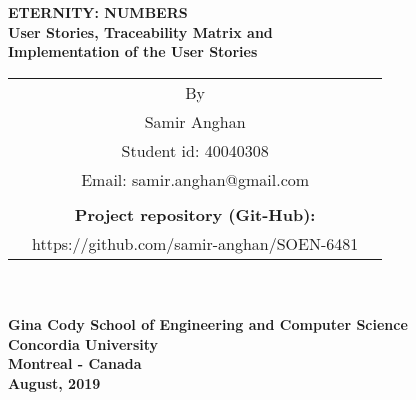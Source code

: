 \thispagestyle{empty}
\begin{center}
\Large \textbf{ ETERNITY: NUMBERS \\User Stories, Traceability Matrix and \\Implementation of the User Stories  \\}
\normalsize
\vspace{84pt}

\large
\begin{tabular}{ccc}
&By&\\
&Samir Anghan&\\
&Student id: 40040308&\\
&Email: samir.anghan@gmail.com&\\ \\
&\textbf{Project repository (Git-Hub):}&\\ &https://github.com/samir-anghan/SOEN-6481&
\end{tabular}\\

\vspace{84pt}
\hspace{5cm} \makebox[6in]{\hrulefill}\\
\large
\textbf{Gina Cody School of Engineering and Computer Science}\\
\textbf{Concordia University} \\
\textbf{Montreal - Canada}\\
\vspace{24pt}
\textbf{August, 2019}
\end{center}
